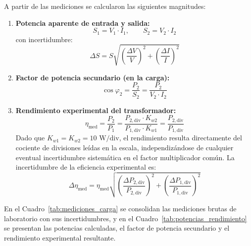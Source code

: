 A partir de las mediciones se calcularon las siguientes magnitudes:
\begin{enumerate}
    \item \textbf{Potencia aparente de entrada y salida:}
    \begin{equation}
        S_1 = V_1 \cdot I_1, \qquad S_2 = V_2 \cdot I_2
        \label{eq:potencia_aparente}
    \end{equation}
    con incertidumbre:
    \begin{equation}
        \Delta S = S \sqrt{\left(\frac{\Delta V}{V}\right)^2 + \left(\frac{\Delta I}{I}\right)^2}
    \end{equation}
    
    \item \textbf{Factor de potencia secundario (en la carga):}
    \begin{equation}
        \cos\varphi_2 = \frac{P_2}{S_2} = \frac{P_2}{V_2 \cdot I_2}
        \label{eq:fp_calc}
    \end{equation}
    
    \item \textbf{Rendimiento experimental del transformador:}
    \begin{equation}
        \eta_{\text{med}} = \frac{P_2}{P_1} = \frac{P_{2,\text{div}} \cdot K_{w2}}{P_{1,\text{div}} \cdot K_{w1}} = \frac{P_{2,\text{div}}}{P_{1,\text{div}}}
        \label{eq:eta_med}
    \end{equation}
    Dado que $K_{w1} = K_{w2} = 10\text{ W/div}$, el rendimiento resulta directamente del cociente de divisiones leídas en la escala, independizándose de cualquier eventual incertidumbre sistemática en el factor multiplicador común. La incertidumbre de la eficiencia experimental es:
    \begin{equation}
        \Delta \eta_{\text{med}} = \eta_{\text{med}} \sqrt{\left(\frac{\Delta P_{2,\text{div}}}{P_{2,\text{div}}}\right)^2 + \left(\frac{\Delta P_{1,\text{div}}}{P_{1,\text{div}}}\right)^2}
        \label{eq:prop_error_eta}
    \end{equation}
\end{enumerate}

En el Cuadro~\ref{tab:mediciones_carga} se consolidan las mediciones brutas de laboratorio con sus incertidumbres, y en el Cuadro~\ref{tab:potencias_rendimiento} se presentan las potencias calculadas, el factor de potencia secundario y el rendimiento experimental resultante.

